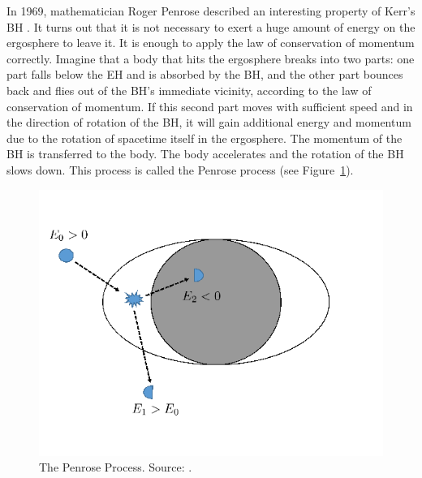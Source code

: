 \documentclass[fleqn,usenatbib]{mnras}
\begin{document}
In 1969, mathematician Roger Penrose described an interesting property of Kerr's BH \citet{penrose2002}. It turns out that it is not necessary to exert a huge amount of energy on the ergosphere to leave it. It is enough to apply the law of conservation of momentum correctly. Imagine that a body that hits the ergosphere breaks into two parts: one part falls below the EH and is absorbed by the BH, and the other part bounces back and flies out of the BH's immediate vicinity, according to the law of conservation of momentum. If this second part moves with sufficient speed and in the direction of rotation of the BH, it will gain additional energy and momentum due to the rotation of spacetime itself in the ergosphere. The momentum of the BH is transferred to the body. The body accelerates and the rotation of the BH slows down. This process is called the Penrose process (see Figure~\ref{fig:penrose_process}).

\begin{figure} 
	\includegraphics[width=\columnwidth]{figures/penrose_process.png}
	\caption{The Penrose Process. Source: \citet{brito2020}.}
	\label{fig:penrose_process}
\end{figure}
\end{document}
